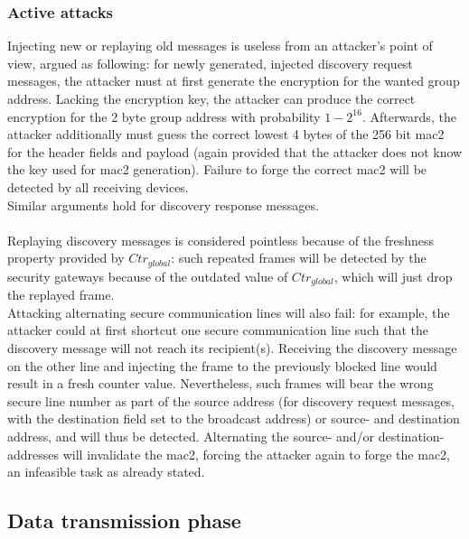 \subsubsection{Active attacks}
Injecting new or replaying old messages is useless from an attacker's point of view, argued as following: for newly generated, injected discovery request messages, the attacker must at first
generate the encryption for the wanted group address. Lacking the encryption key, the attacker can produce the correct encryption for the 2 byte group address with probability
$1-2^{16}$. Afterwards, the attacker additionally must guess the correct lowest 4 bytes of the 256 bit \gls{mac2} for the header fields and payload (again provided that the attacker
does not know the key used for \gls{mac2} generation). Failure to forge the correct \gls{mac2} will be detected by all receiving devices.
\\
Similar arguments hold for discovery response messages.
\\
\\
Replaying discovery messages is considered pointless because of the freshness property provided by $Ctr_{global}$: such repeated frames will be detected by the security gateways
because of the outdated value of $Ctr_{global}$, which will just drop the replayed frame. 
\\
Attacking alternating secure communication lines will also fail: for example, the attacker could at first
shortcut one secure communication line such that the discovery message will not reach its recipient(s). Receiving the discovery message on the other line and injecting the frame to the
previously blocked line would result in a fresh counter value. Nevertheless, such frames will bear the wrong secure line number as part of the source address (for discovery request
messages, with the destination field set to the broadcast address) or source- and destination address, and will thus be detected.
Alternating the source- and/or destination-addresses will invalidate the \gls{mac2}, forcing the attacker again to forge the \gls{mac2}, an infeasible task as already stated.

\subsection{Data transmission phase}

